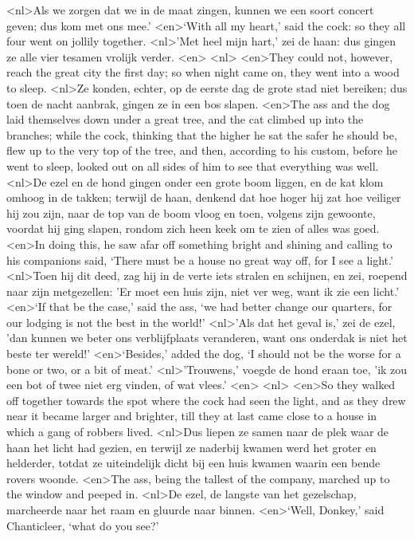 <nl>Als we zorgen dat we in de maat zingen, kunnen we een soort concert geven; dus kom met ons mee.'
<en>‘With all my heart,’ said the cock: so they all four went on jollily together.
<nl>'Met heel mijn hart,' zei de haan: dus gingen ze alle vier tesamen vrolijk verder.
<en>
<nl>
<en>They could not, however, reach the great city the first day; so when night came on, they went into a wood to sleep.
<nl>Ze konden, echter, op de eerste dag de grote stad niet bereiken; dus toen de nacht aanbrak, gingen ze in een bos slapen.
<en>The ass and the dog laid themselves down under a great tree, and the cat climbed up into the branches; while the cock, thinking that the higher he sat the safer he should be, flew up to the very top of the tree, and then, according to his custom, before he went to sleep, looked out on all sides of him to see that everything was well.
<nl>De ezel en de hond gingen onder een grote boom  liggen, en de kat klom omhoog in de takken; terwijl de haan, denkend dat hoe hoger hij zat hoe veiliger hij zou zijn, naar de top van de boom vloog en toen, volgens zijn gewoonte, voordat hij ging slapen, rondom zich heen keek om te zien of alles was goed.
<en>In doing this, he saw afar off something bright and shining and calling to his companions said, ‘There must be a house no great way off, for I see a light.’
<nl>Toen hij dit deed, zag hij in de verte iets stralen en schijnen, en zei, roepend naar zijn metgezellen: 'Er moet een huis zijn, niet ver weg, want ik zie een licht.'
<en>‘If that be the case,’ said the ass, ‘we had better change our quarters, for our lodging is not the best in the world!’
<nl>'Als dat het geval is,' zei de ezel, 'dan kunnen we beter ons verblijfplaats veranderen, want ons onderdak is niet het beste ter wereld!'
<en>‘Besides,’ added the dog, ‘I should not be the worse for a bone or two, or a bit of meat.’
<nl>'Trouwens,' voegde de hond eraan toe, 'ik zou  een bot of twee niet erg vinden, of wat vlees.'
<en>
<nl>
<en>So they walked off together towards the spot where the cock had seen the light, and as they drew near it became larger and brighter, till they at last came close to a house in which a gang of robbers lived.
<nl>Dus liepen ze samen naar de plek waar de haan het licht had gezien, en terwijl ze naderbij kwamen werd het groter en helderder, totdat ze uiteindelijk dicht bij een huis kwamen waarin een bende rovers woonde.
<en>The ass, being the tallest of the company, marched up to the window and peeped in.
<nl>De ezel, de langste van het gezelschap, marcheerde naar het raam en gluurde naar binnen.
<en>‘Well, Donkey,’ said Chanticleer, ‘what do you see?’
